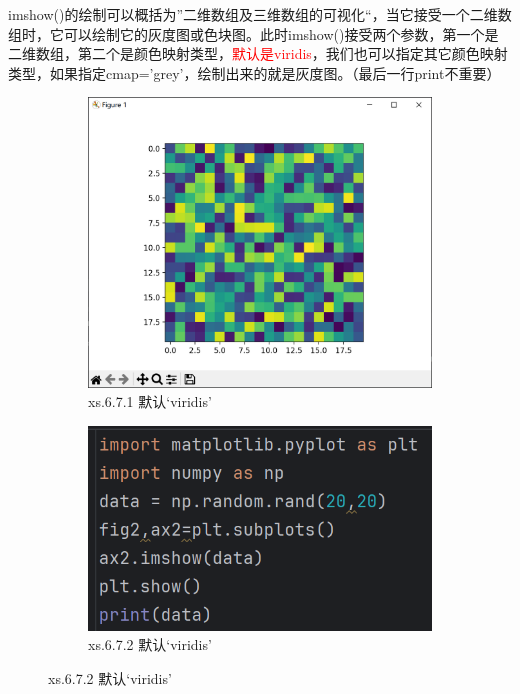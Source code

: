 \documentclass[12pt]{article}
\begin{document}
imshow()的绘制可以概括为”二维数组及三维数组的可视化“，当它接受一个二维数组时，它可以绘制它的灰度图或色块图。此时imshow()接受两个参数，第一个是二维数组，第二个是颜色映射类型，\textcolor{red}{默认是viridis}，我们也可以指定其它颜色映射类型，如果指定cmap='grey'，绘制出来的就是灰度图。（最后一行print不重要）
\begin{figure}[H]
    \centering
    \begin{subfigure}[b]{0.48\textwidth}
        \includegraphics[width=\textwidth]{颜色映射 二维 Pic1.png} %
        \caption{xs.6.7.1 默认‘viridis’}
        \label{fig:line-graph2}
    \end{subfigure}
    \hfill
    \begin{subfigure}[b]{0.48\textwidth}
        \includegraphics[width=\textwidth]{颜色映射 二维 program1.png} %
        \caption{xs.6.7.2 默认‘viridis’}
        \label{fig:line-graph2-pic2}
    \end{subfigure}
\end{figure}
\end{document}

